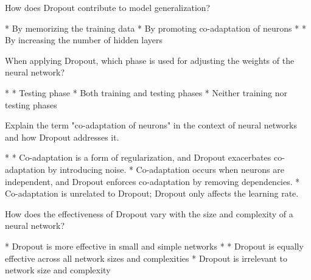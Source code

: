 \documentclass[11pt]{extarticle}
\begin{document}
\begin{exercise}
    How does Dropout contribute to model generalization?
    \begin{choice}
        * By memorizing the training data
        * By promoting co-adaptation of neurons
        * 
        * By increasing the number of hidden layers
    \end{choice}
\end{exercise}
\begin{solution}
\end{solution}

\begin{exercise}
    When applying Dropout, which phase is used for adjusting the weights of the neural network?
    \begin{choice}
        * 
        * Testing phase
        * Both training and testing phases
        * Neither training nor testing phases
    \end{choice}
\end{exercise}
\begin{solution}
\end{solution}

\begin{exercise}
    Explain the term "co-adaptation of neurons" in the context of neural networks and how Dropout addresses it.
    \begin{choice}
        * 
        * Co-adaptation is a form of regularization, and Dropout exacerbates co-adaptation by introducing noise.
        * Co-adaptation occurs when neurons are independent, and Dropout enforces co-adaptation by removing dependencies.
        * Co-adaptation is unrelated to Dropout; Dropout only affects the learning rate.
    \end{choice}
\end{exercise}
\begin{solution}
\end{solution}

\begin{exercise}
    How does the effectiveness of Dropout vary with the size and complexity of a neural network?
    \begin{choice}
        * Dropout is more effective in small and simple networks
        * 
        * Dropout is equally effective across all network sizes and complexities
        * Dropout is irrelevant to network size and complexity
    \end{choice}
\end{exercise}
\begin{solution}
\end{solution}
\end{document}
